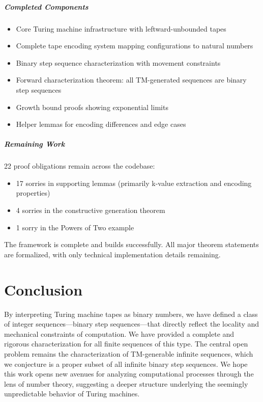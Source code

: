 \begin{lemma}
\paragraph{Completed Components}
\begin{itemize}
\item Core Turing machine infrastructure with leftward-unbounded tapes
\item Complete tape encoding system mapping configurations to natural numbers  
\item Binary step sequence characterization with movement constraints
\item Forward characterization theorem: all TM-generated sequences are binary step sequences
\item Growth bound proofs showing exponential limits
\item Helper lemmas for encoding differences and edge cases
\end{itemize}

\paragraph{Remaining Work}
22 proof obligations remain across the codebase:
\begin{itemize}
\item 17 sorries in supporting lemmas (primarily k-value extraction and encoding properties)
\item 4 sorries in the constructive generation theorem 
\item 1 sorry in the Powers of Two example
\end{itemize}

The framework is complete and builds successfully. All major theorem statements are formalized, with only technical implementation details remaining.

\chapter{Conclusion}

By interpreting Turing machine tapes as binary numbers, we have defined a class of integer sequences---binary step sequences---that directly reflect the locality and mechanical constraints of computation. We have provided a complete and rigorous characterization for all finite sequences of this type. The central open problem remains the characterization of TM-generable infinite sequences, which we conjecture is a proper subset of all infinite binary step sequences. We hope this work opens new avenues for analyzing computational processes through the lens of number theory, suggesting a deeper structure underlying the seemingly unpredictable behavior of Turing machines.


\end{lemma}

